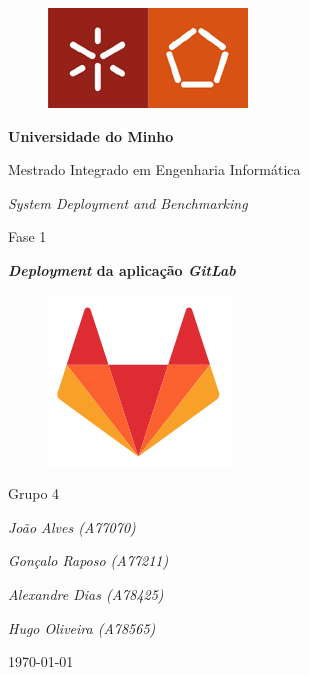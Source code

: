\documentclass[12pt,a4paper]{article}
\begin{document}
\begin{titlepage}
    \centering
    \begin{figure}[H]
        \centering
        \includegraphics[scale=2.2]{images/logo_um.jpg}
    \end{figure}
    {\huge\bfseries Universidade do Minho \par}
    \vspace{0.5cm}
    {\large Mestrado Integrado em Engenharia Informática \par}
    \vspace{2cm}
    {\Large \emph{System Deployment and Benchmarking} \par}
    \vspace{2cm}
    {\Large Fase 1 \par}
    \vspace{0.2cm}
    {\Large\bfseries \emph{Deployment} da aplicação \emph{GitLab} \par}
    \begin{figure}[H]
        \centering
        \includegraphics[scale=0.5]{images/gitlab_logo.png}
    \end{figure}
    \vspace{2.5cm}
    {\Large Grupo 4 \par}
     \vspace{0.5cm}
    {\Large\itshape João Alves (A77070)\par}
    {\Large\itshape Gonçalo Raposo (A77211)\par}
    {\Large\itshape Alexandre Dias (A78425)\par}
    {\Large\itshape Hugo Oliveira (A78565)\par}
    \vfill
    {\large \today\par}
    \centering
\end{titlepage}
\end{document}
